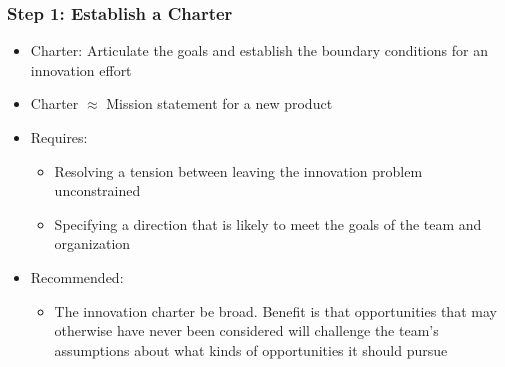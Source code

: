 \documentclass[a4paper,12pt,openany]{book}
\begin{document}
\subsubsection{Step 1: Establish a Charter}
\begin{itemize}
    \item Charter: Articulate the goals and establish the boundary conditions for an innovation effort
    \item Charter $\approx$ Mission statement for a new product
    \item Requires:
    \begin{itemize}
        \item Resolving a tension between leaving the innovation problem unconstrained
        \item Specifying a direction that is likely to meet the goals of the team and organization
    \end{itemize}
    \item Recommended:
    \begin{itemize}
        \item The innovation charter be broad. Benefit is that opportunities that may otherwise have never been considered will challenge the team’s assumptions about what kinds of opportunities it should pursue
    \end{itemize}
\end{itemize}
\end{document}
